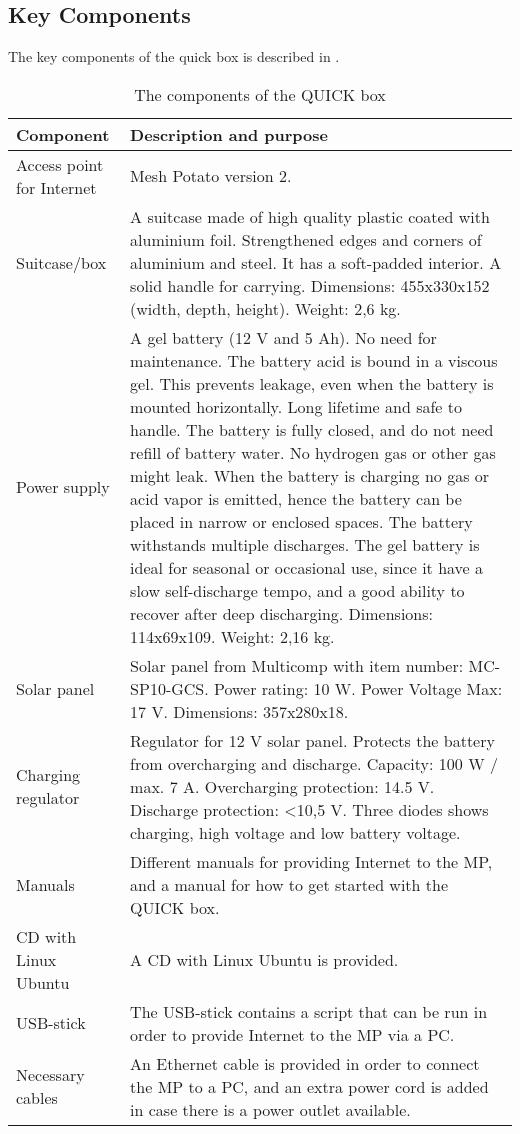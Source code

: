 \subsection{Key Components}
The key components of the \gls{quick} box is described in . 

\begin{center}
\begin{table}[t]
\caption{\label{tab:components}The components of the QUICK box}
    \begin{tabular}{ | l | p{9cm} |}
    \hline
    \textbf{Component} & \textbf{Description and purpose} \\ 
    \hline
    Access point for Internet &  Mesh Potato version 2.\\ 
    \hline
    Suitcase/box &  A suitcase made of high quality plastic coated with aluminium foil. Strengthened edges and corners of aluminium and steel. It has a soft-padded interior. A solid handle for carrying. Dimensions: 455x330x152 (width, depth, height). Weight: 2,6 kg. \\ 
    \hline
    Power supply & A gel battery (12 V and 5 Ah). No need for maintenance. The battery acid is bound in a viscous gel. This prevents leakage, even when the battery is mounted horizontally. Long lifetime and safe to handle. The battery is fully closed, and do not need refill of battery water. No hydrogen gas or other gas might leak. When the battery is charging no gas or acid vapor is emitted, hence the battery can be placed in narrow or enclosed spaces. The battery withstands multiple discharges. The gel battery is ideal for seasonal or occasional use, since it have a slow self-discharge tempo, and a good ability to recover after deep discharging. Dimensions: 114x69x109. Weight: 2,16 kg. \\
    \hline
	Solar panel & Solar panel from Multicomp with item number: MC-SP10-GCS. Power rating: 10 W. Power Voltage Max: 17 V. Dimensions: 357x280x18.\\
	\hline
	Charging regulator & Regulator for 12 V solar panel. Protects the battery from overcharging and discharge. Capacity: 100 W / max. 7 A. Overcharging protection: 14.5 V. Discharge protection: <10,5 V. Three diodes shows charging, high voltage and low battery voltage. \\
	\hline
	Manuals & Different manuals for providing Internet to the MP, and a manual for how to get started with the QUICK box.\\
	\hline
	CD with Linux Ubuntu & A CD with Linux Ubuntu is provided.\\
	\hline
	USB-stick & The USB-stick contains a script that can be run in order to provide Internet to the MP via a PC.\\
	\hline
	Necessary cables & An Ethernet cable is provided in order to connect the MP to a PC, and an extra power cord is added in case there is a power outlet available. \\
	\hline
    \end{tabular}
   \end{table}
\end{center}

